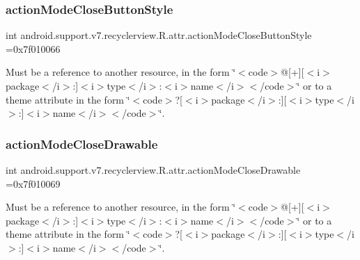 \subsubsection{\texorpdfstring{action\+Mode\+Close\+Button\+Style}{actionModeCloseButtonStyle}}
{\footnotesize\ttfamily int android.\+support.\+v7.\+recyclerview.\+R.\+attr.\+action\+Mode\+Close\+Button\+Style =0x7f010066\hspace{0.3cm}{\ttfamily [static]}}

Must be a reference to another resource, in the form \char`\"{}$<$code$>$@\mbox{[}+\mbox{]}\mbox{[}$<$i$>$package$<$/i$>$\+:\mbox{]}$<$i$>$type$<$/i$>$\+:$<$i$>$name$<$/i$>$$<$/code$>$\char`\"{} or to a theme attribute in the form \char`\"{}$<$code$>$?\mbox{[}$<$i$>$package$<$/i$>$\+:\mbox{]}\mbox{[}$<$i$>$type$<$/i$>$\+:\mbox{]}$<$i$>$name$<$/i$>$$<$/code$>$\char`\"{}. \mbox{\label{classandroid_1_1support_1_1v7_1_1recyclerview_1_1R_1_1attr_a1c71cd703914f826df70a93c5fc16d50}} 
\subsubsection{\texorpdfstring{action\+Mode\+Close\+Drawable}{actionModeCloseDrawable}}
{\footnotesize\ttfamily int android.\+support.\+v7.\+recyclerview.\+R.\+attr.\+action\+Mode\+Close\+Drawable =0x7f010069\hspace{0.3cm}{\ttfamily [static]}}

Must be a reference to another resource, in the form \char`\"{}$<$code$>$@\mbox{[}+\mbox{]}\mbox{[}$<$i$>$package$<$/i$>$\+:\mbox{]}$<$i$>$type$<$/i$>$\+:$<$i$>$name$<$/i$>$$<$/code$>$\char`\"{} or to a theme attribute in the form \char`\"{}$<$code$>$?\mbox{[}$<$i$>$package$<$/i$>$\+:\mbox{]}\mbox{[}$<$i$>$type$<$/i$>$\+:\mbox{]}$<$i$>$name$<$/i$>$$<$/code$>$\char`\"{}. \mbox{\label{classandroid_1_1support_1_1v7_1_1recyclerview_1_1R_1_1attr_a73fe51ef8fd0cfa3f3b9179f28fe3141}} 
